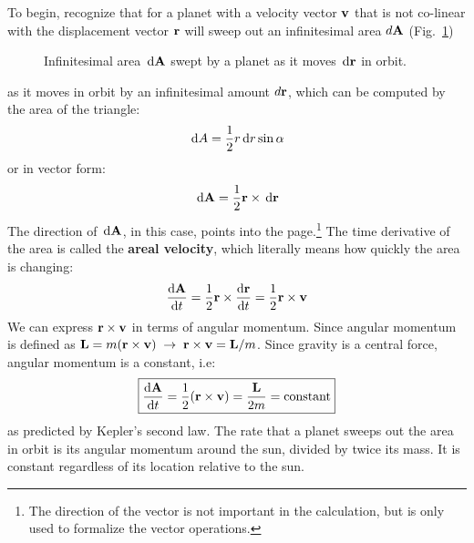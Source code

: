 \documentclass{../../../oss-handout}
\newcommand{\mb}[1]{\ensuremath\mathbf{#1}}
\begin{document}
To begin, recognize that for a planet with a velocity vector $\mb{v}$ that is
not co-linear with the displacement vector $\mb{r}$ will sweep out an
infinitesimal area $d\mb{A}$ (Fig.~\ref{fig:dA})
\begin{figure}[ht]
  \centering
  \caption{Infinitesimal area $\dl\mb{A}$ swept by a planet as it moves
    $\dl\mb{r}$ in orbit.}
  \label{fig:dA}
\end{figure}
as it moves in orbit by an infinitesimal amount $d\mb{r}$, which can be
computed by the area of the triangle:
\begin{equation}
  \dl A=\frac12r\dl r\sin\alpha
\end{equation}
or in vector form:
\begin{equation}
  \dl\mb{A}=\frac12\mb{r}\times \dl\mb{r}
\end{equation}
The direction of $\dl\mb{A}$, in this case, points into the page.\footnote{The
  direction of the vector is not important in the calculation, but is only used
  to formalize the vector operations.} The time derivative of the area is
called the \textbf{areal velocity}, which literally means how quickly the area
is changing:
\begin{equation}
  \diff{\mb{A}}t
  =\frac12\mb{r}\times\diff{\mb{r}}t
  =\frac12\mb{r}\times\mb{v}
\end{equation}
We can express $\mb{r}\times\mb{v}$ in terms of angular momentum. Since angular
momentum is defined as $\mb{L}=m(\mb{r}\times\mb{v})\;\rightarrow\;
\mb{r}\times\mb{v}=\mb{L}/m$. Since gravity is a central force, angular
momentum is a constant, i.e:
\begin{equation}
  \boxed{\diff{\mb{A}}t=\frac12(\mb{r}\times\mb{v})=\frac{\mb{L}}{2m}=
    \text{constant}
  }
  \label{constant}
\end{equation}
as predicted by Kepler's second law. The rate that a planet sweeps out the area
in orbit is its angular momentum around the sun, divided by twice its mass. It
is constant regardless of its location relative to the sun.
\end{document}
